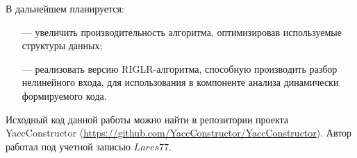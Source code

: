 \documentclass[14pt]{matmex-diploma-custom}
\begin{document}
В дальнейшем планируется:
\begin{itemize}
\item[---]  увеличить производительность алгоритма, оптимизировав используемые структуры данных;
\item[---] реализовать версию RIGLR-алгоритма, способную производить разбор нелинейного входа, для использования в компоненте анализа динамически формируемого кода.
\end{itemize}

Исходный код данной работы можно найти в репозитории проекта YaccConstructor (\hyperlink{a}{https://github.com/YaccConstructor/YaccConstructor}). Автор работал под учетной записью $Lares77$.


\setmonofont[Mapping=tex-text]{CMU Typewriter Text}


\end{document}
